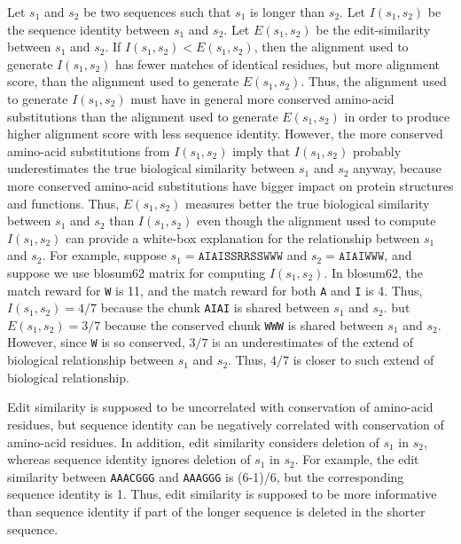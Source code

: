 \documentclass[11pt,letterpaper]{article}
\begin{document}
Let \(s_1\) and \(s_2\) be two sequences such that \(s_1\) is longer than \(s_2\).
Let \(I(s_1, s_2)\) be the sequence identity between \(s_1\) and \(s_2\).
Let \(E(s_1, s_2)\) be the edit-similarity between \(s_1\) and \(s_2\).
If \(I(s_1, s_2) < E(s_1, s_2)\), then the alignment used to generate \(I(s_1, s_2)\) has fewer matches of identical residues, but more alignment score, than the alignment used to generate \(E(s_1, s_2)\).
Thus, the alignment used to generate \(I(s_1, s_2)\) must have in general more conserved amino-acid substitutions than the alignment used to generate \(E(s_1, s_2)\) in order to produce higher alignment score with less sequence identity.
However, the more conserved amino-acid substitutions from \(I(s_1, s_2)\) imply that \(I(s_1, s_2)\) probably underestimates the true biological similarity between \(s_1\) and \(s_2\) anyway, because more conserved amino-acid substitutions have bigger impact on protein structures and functions.
Thus, \(E(s_1, s_2)\) measures better the true biological similarity between \(s_1\) and \(s_2\) than \(I(s_1, s_2)\) even though the alignment used to compute \(I(s_1, s_2)\) can provide a white-box explanation for the relationship between \(s_1\) and \(s_2\).
For example, suppose \(s_1 = \texttt{AIAISSRRSSWWW}\) and \(s_2 = \texttt{AIAIWWW}\), 
and suppose we use blosum62 matrix for computing \(I(s_1, s_2)\).
In blosum62, the match reward for \texttt{W} is 11, and the match reward for both \texttt{A} and \texttt{I} is 4.
Thus, \(I(s_1, s_2) = 4/7\) because the           chunk \texttt{AIAI} is shared between \(s_1\) and \(s_2\).
but \(E(s_1, s_2) = 3/7\) because the conserved chunk \texttt{WWW}  is shared between \(s_1\) and \(s_2\).
However, since \texttt{W} is so conserved, \(3/7\) is an underestimates of the extend of biological relationship between \(s_1\) and \(s_2\).
Thus, \(4/7\) is closer to such extend of biological relationship.

Edit similarity is supposed to be uncorrelated with conservation of amino-acid residues, but sequence identity can be negatively correlated with conservation of amino-acid residues.
In addition, edit similarity considers deletion of \(s_1\) in \(s_2\), whereas sequence identity ignores deletion of \(s_1\) in \(s_2\).
For example, the edit similarity between \texttt{AAACGGG} and \texttt{AAAGGG} is (6-1)/6, but the corresponding sequence identity is 1. Thus, edit similarity is supposed to be more informative than sequence identity if part of the longer sequence is deleted in the shorter sequence.

\fi
\end{document}
